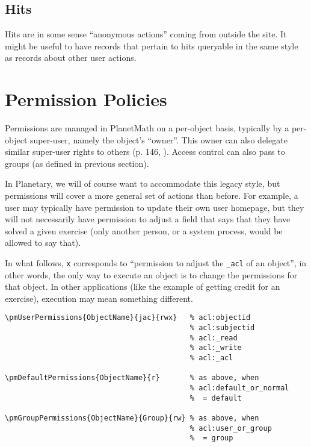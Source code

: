 \documentclass{article}
\begin{document}
\subsection{Hits}
Hits are in some sense ``anonymous actions'' coming from
outside the site.  It might be useful to have records that
pertain to hits queryable in the same style as records
about other user actions.

\section{Permission Policies} \label{permissions}

Permissions are managed in PlanetMath on a per-object
basis, typically by a per-object super-user, namely the
object's ``owner''.  This owner can also delegate similar
super-user rights to others (p. 146, \cite{KrowneThesis}).
Access control can also pass to groups (as defined in
previous section).

In Planetary, we will of course want to accommodate this
legacy style, but permissions will cover a more general
set of actions than before.  For example, a user may
typically have permission to update their own user
homepage, but they will not necessarily have permission to
adjust a field that says that they have solved a given
exercise (only another person, or a system process, would
be allowed to say that).

In what follows, \verb|x| corresponds to ``permission to
adjust the \verb|_acl| of an object'', in other words, the
only way to execute an object is to change the permissions
for that object.  In other applications (like the example
of getting credit for an exercise), execution may mean
something different.

\begin{verbatim}
\pmUserPermissions{ObjectName}{jac}{rwx}   % acl:objectid
                                           % acl:subjectid
                                           % acl:_read
                                           % acl:_write
                                           % acl:_acl

\pmDefaultPermissions{ObjectName}{r}       % as above, when
                                           % acl:default_or_normal
                                           %  = default

\pmGroupPermissions{ObjectName}{Group}{rw} % as above, when
                                           % acl:user_or_group
                                           %  = group
\end{verbatim}
\end{document}
